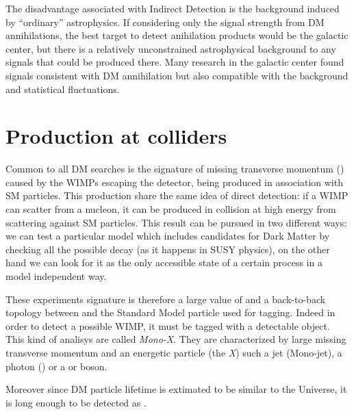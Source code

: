The disadvantage associated with Indirect Detection is the background induced by ``ordinary'' astrophysics. If considering only the signal strength from DM annihilations, the best target to detect anihilation products would be the galactic center, but there is a relatively unconstrained astrophysical background to any signals that could be produced there. Many research in the galactic center found signals consistent with DM annihilation but also compatible with the background and statistical fluctuations.

\section{Production at colliders}
Common to all DM searches is the signature of missing transverse momentum (\met) caused by the WIMPs escaping the detector, being produced in association with SM particles. This production share the same idea of direct detection: if a WIMP can scatter from a nucleon, it can be produced in \pp collision at high energy from scattering against SM particles. This result can be pursued in two different ways: we can test a particular model which includes candidates for Dark Matter by checking all the possible decay (as it happens in SUSY physics), on the other hand we can look for it as the only accessible state of a certain process in a model independent way.

These experiments signature is therefore a large value of \met and a back-to-back topology between \met and the Standard Model particle used for tagging. Indeed in order to detect a possible WIMP, it must be tagged with a detectable object. This kind of analisys are called \emph{Mono-X}. They are  characterized by large missing transverse momentum and an energetic particle (the \emph{X}) such a jet (Mono-jet), a photon (\mph) or a \Wboson or \Zboson boson. 

Moreover since DM particle lifetime is extimated to be similar to the Universe, it is long enough to be detected as \met.








